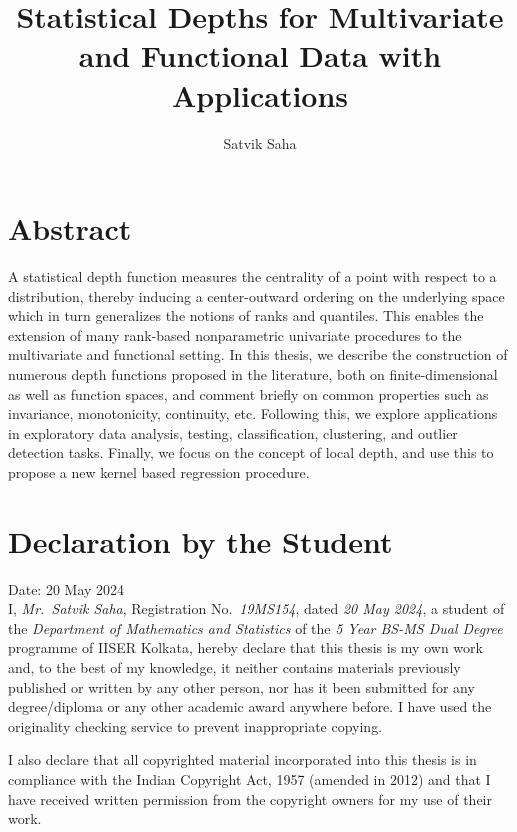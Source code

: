 \documentclass[12pt]{report}
\title{Statistical Depths for Multivariate and Functional Data with Applications}
\author{Satvik Saha}
\date{}
\begin{document}
    


    \chapter*{Abstract}

    A statistical depth function measures the centrality of a point with
    respect to a distribution, thereby inducing a center-outward ordering on
    the underlying space which in turn generalizes the notions of ranks and
    quantiles.
    This enables the extension of many rank-based nonparametric univariate
    procedures to the multivariate and functional setting.
    In this thesis, we describe the construction of numerous depth functions
    proposed in the literature, both on finite-dimensional as well as function
    spaces, and comment briefly on common properties such as invariance,
    monotonicity, continuity, etc.
    Following this, we explore applications in exploratory data analysis,
    testing, classification, clustering, and outlier detection tasks.
    Finally, we focus on the concept of local depth, and use this to propose a
    new kernel based regression procedure.





    \chapter*{Declaration by the Student}

    Date: 20 May 2024\\

    I, \textit{Mr.~Satvik Saha}, Registration No.~\textit{19MS154}, dated
    \textit{20 May 2024}, a student of the \textit{Department of Mathematics
    and Statistics} of the \textit{5 Year BS-MS Dual Degree} programme of
    IISER Kolkata, hereby declare that this thesis is my own work and, to the
    best of my knowledge, it neither contains materials previously published
    or written by any other person, nor has it been submitted for any
    degree/diploma or any other academic award anywhere before.
    I have used the originality checking service to prevent inappropriate
    copying.

    I also declare that all copyrighted material incorporated into this thesis
    is in compliance with the Indian Copyright Act, 1957 (amended in 2012) and
    that I have received written permission from the copyright owners for my
    use of their work.
\end{document}

